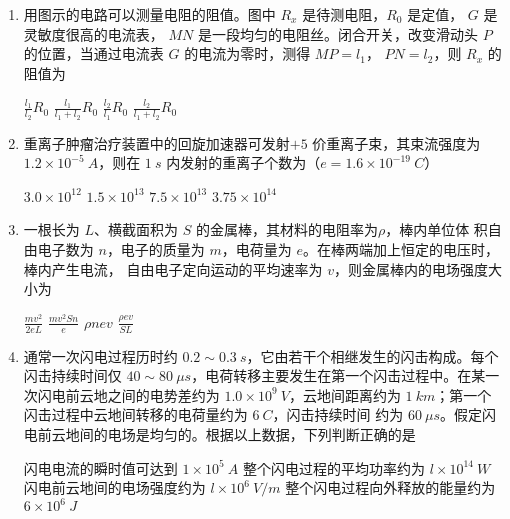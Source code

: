 \begin{enumerate}
\item
{}
用图示的电路可以测量电阻的阻值。图中 $ R_{x} $ 是待测电阻，$ R_{0} $ 是定值， $ G $ 是灵敏度很高的电流表，
$ MN $ 是一段均匀的电阻丝。闭合开关，改变滑动头 $ P $ 的位置，当通过电流表 $ G $ 的电流为零时，测得
$ MP= l_{1} $， $ PN= l_{2} $，则 $ R_{x} $ 的阻值为  
\begin{figure}[h!]
\centering

\end{figure}


\fourchoices
{$\frac{l_{1}}{l_{2}} R_{0}$}
{$\frac{l_{1}}{l_{1}+l_{2}} R_{0}$}
{$\frac{l_{2}}{l_{1}} R_{0}$}
{$\frac{l_{2}}{l_{1}+l_{2}} R_{0}$}


\item 
{}
重离子肿瘤治疗装置中的回旋加速器可发射$ +5 $ 价重离子束，其束流强度为
$ 1.2 \times 10^{-5} \ A $，则在 $ 1 \ s $ 内发射的重离子个数为（$ e=1.6 \times 10^{-19} \ C $）  

\fourchoices
{$ 3.0 \times 10^{12} $}
{$ 1.5 \times 10^{13} $}
{$ 7.5 \times 10^{13} $}
{$ 3.75 \times 10^{14} $}


\item 
{}
一根长为 $ L $、横截面积为 $ S $ 的金属棒，其材料的电阻率为$ \rho $，棒内单位体
积自由电子数为 $ n $，电子的质量为 $ m $，电荷量为 $ e $。在棒两端加上恒定的电压时，棒内产生电流，
自由电子定向运动的平均速率为 $ v $，则金属棒内的电场强度大小为  
\begin{figure}[h!]
\centering

\end{figure}

\fourchoices
{$\frac{m v^{2}}{2 e L}$}
{$\frac{m v^{2} S n}{e}$}
{$ \rho nev $}
{$\frac{\rho e v}{S L}$}


\item
{}
通常一次闪电过程历时约 $ 0.2 \sim 0.3 \ s $，它由若干个相继发生的闪击构成。每个闪击持续时间仅
$ 40 \sim 80 \ \mu s $，电荷转移主要发生在第一个闪击过程中。在某一次闪电前云地之间的电势差约为
$ 1.0 \times 10^{9} \ V $，云地间距离约为 $ 1 \ km $；第一个闪击过程中云地间转移的电荷量约为 $ 6 \ C $，闪击持续时间
约为 $ 60 \ \mu s $。假定闪电前云地间的电场是均匀的。根据以上数据，下列判断正确的是  

\fourchoices
{闪电电流的瞬时值可达到 $ 1 \times 10^{5} \ A $}
{整个闪电过程的平均功率约为 $ l \times 10^{14} \ W $}
{闪电前云地间的电场强度约为 $ l \times 10^{6} \ V/m $}
{整个闪电过程向外释放的能量约为 $ 6 \times 10^{6} \ J $}



\end{enumerate}
